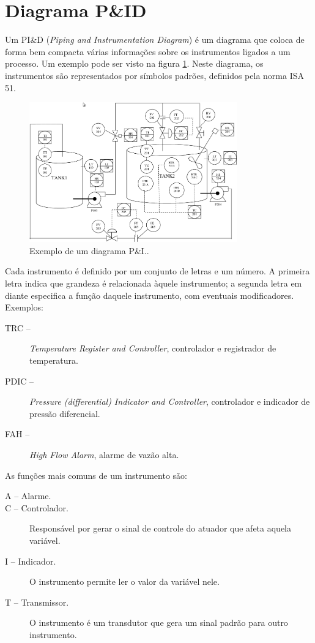 \section{Diagrama P\&ID}

Um PI\&D (\emph{Piping and Instrumentation Diagram}) é um diagrama que coloca de forma bem compacta várias informações sobre os instrumentos ligados a um processo. Um exemplo pode ser visto na figura \ref{fig:exemploPID}. Neste diagrama, os instrumentos são representados por símbolos padrões, definidos pela norma ISA 51.

\begin{figure}[h]
  \centering
  \includegraphics[width = 0.8\textwidth]{figuras/exemploPID}
  \caption{Exemplo de um diagrama P\&I.\label{fig:exemploPID}.}
\end{figure}

Cada instrumento é definido por um conjunto de letras e um número. A primeira letra indica que grandeza é relacionada àquele instrumento; a segunda letra em diante especifica a função daquele instrumento, com eventuais modificadores.
Exemplos:
\begin{description}
  \item[TRC --] \emph{Temperature Register and Controller}, controlador e registrador de temperatura.
  \item[PDIC --] \emph{Pressure (differential) Indicator and Controller}, controlador e indicador de pressão diferencial.
  \item[FAH --] \emph{High Flow Alarm}, alarme de vazão alta.
\end{description}

As funções mais comuns de um instrumento são:
\begin{description}
  \item[A -- Alarme.]
  \item[C -- Controlador.] Responsável por gerar o sinal de controle do atuador que afeta aquela variável.
  \item[I -- Indicador.] O instrumento permite ler o valor da variável nele.
  \item[T -- Transmissor.] O instrumento é um transdutor que gera um sinal padrão para outro instrumento.
\end{description}

